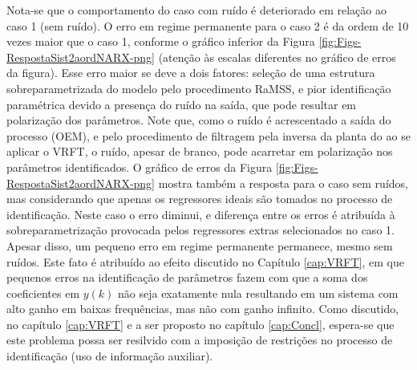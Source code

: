 \begin{exmp}
Nota-se que o comportamento do caso com ruído é deteriorado em relação ao caso 1 (sem ruído). O erro em regime permanente para o caso 2 é da ordem de 10 vezes maior que o caso 1, conforme o gráfico inferior da Figura \ref{fig:Figs-RespostaSist2aordNARX-png} (atenção às escalas diferentes no gráfico de erros da figura).
Esse erro maior se deve a dois fatores: seleção de uma estrutura sobreparametrizada do modelo pelo procedimento RaMSS, e pior identificação paramétrica devido a presença do ruído na saída, que pode resultar em polarização dos parâmetros.
Note que, como o ruído é acrescentado a saída do processo (OEM), e pelo procedimento de filtragem pela inversa da planta do ao se aplicar o VRFT, o ruído, apesar de branco, pode acarretar em polarização nos parâmetros identificados.
O gráfico de erros da Figura \ref{fig:Figs-RespostaSist2aordNARX-png} mostra também a resposta para o caso sem ruídos, mas considerando que apenas os regressores ideais são tomados no processo de identificação.
Neste caso o erro diminui, e diferença entre os erros é atribuída à sobreparametrização provocada pelos regressores extras selecionados no caso 1. 
Apesar disso, um pequeno erro em regime permanente permanece, mesmo sem ruídos. Este fato é atribuído ao efeito discutido no Capítulo \ref{cap:VRFT}, em que pequenos erros na identificação de parâmetros fazem com que a soma dos coeficientes em $y(k)$ não seja exatamente nula resultando em um sistema com alto ganho em baixas frequências, mas não com ganho infinito. Como discutido, no capítulo \ref{cap:VRFT} e a ser proposto no capítulo \ref{cap:Concl}, espera-se que este problema possa ser resilvido com a imposição de restrições no processo de identificação (uso de informação auxiliar).






\end{exmp}




